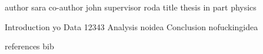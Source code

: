 author  sara
co-author john
supervisor roda
title  thesis in part physics

Introduction  yo
Data  12343
Analysis  noidea
Conclusion nofuckingidea

references  bib 
